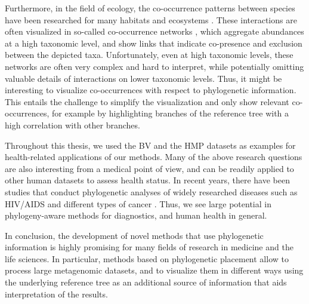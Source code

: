 Furthermore, in the field of ecology, the co-occurrence patterns between species
have been researched for many habitats and ecosystems \cite{Lima-Mendez2015,Villalobos2017,Zelezniak2015}.
These interactions are often visualized in so-called co-occurrence networks \cite{Chaffron2010,Faust2012},
which aggregate abundances at a high taxonomic level,
and show links that indicate co-presence and exclusion between the depicted taxa.
Unfortunately, even at high taxonomic levels, these networks are often very complex and hard to interpret,
while potentially omitting valuable details of interactions on lower taxonomic levels.
Thus, it might be interesting to visualize co-occurrences with respect to phylogenetic information.
This entails the challenge to simplify the visualization and only show relevant co-occurrences,
for example by highlighting branches of the reference tree with a high correlation with other branches.

Throughout this thesis, we used the \acf{BV} \cite{Srinivasan2012} and the \acf{HMP} \citep{Huttenhower2012,Methe2012}
datasets as examples for health-related applications of our methods.
Many of the above research questions are also interesting from a medical point of view,
and can be readily applied to other human datasets to assess health status.
In recent years, there have been studies that conduct phylogenetic analyses of widely researched diseases
such as HIV/AIDS \cite{Castro-Nallar2012,Brenner2013} and different types of cancer \cite{Brown2017a,Abbosh2017}.
Thus, we see large potential in phylogeny-aware methods for diagnostics, and human health in general.

In conclusion, the development of novel methods that use phylogenetic information
is highly promising for many fields of research in medicine and the life sciences.
In particular, methods based on phylogenetic placement allow to process large metagenomic datasets,
and to visualize them in different ways using the underlying reference tree as an additional source
of information that aids interpretation of the results.
